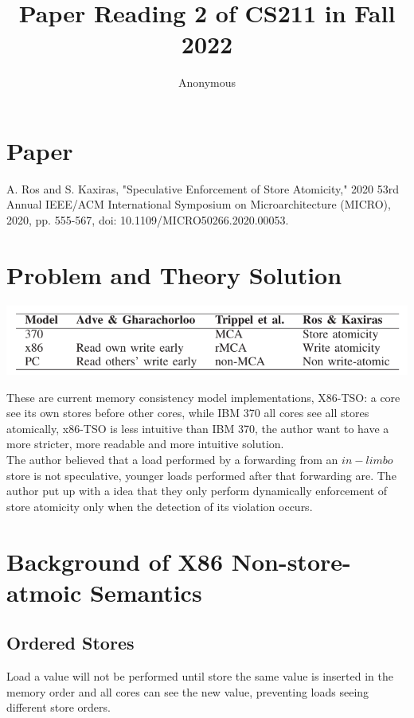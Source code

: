\documentclass[10pt,a4paper]{article}
\begin{document}
\title{Paper Reading 2 of CS211 in Fall 2022}
\author{Anonymous}
\date{}
\maketitle


\section{Paper}
A. Ros and S. Kaxiras, "Speculative Enforcement of Store Atomicity," 2020 53rd Annual IEEE/ACM International Symposium on Microarchitecture (MICRO), 2020, pp. 555-567, doi: 10.1109/MICRO50266.2020.00053.

\section{Problem and Theory Solution}
\begin{center}
	\includegraphics[scale = 0.4]{1.png}
\end{center}
These are current memory consistency model implementations, X86-TSO: a core see its own stores before other cores, while IBM 370 all cores see all stores atomically, x86-TSO is less intuitive than IBM 370, the author want to have a more stricter, more readable and more intuitive solution. \\
The author believed that a load performed by a forwarding from an $in-limbo$ store is not speculative, younger loads performed after that forwarding are. The author put up with a idea that they only perform dynamically enforcement of store atomicity only when the detection of its violation occurs.

\section{Background of X86 Non-store-atmoic Semantics}
\subsection{Ordered Stores}
Load a value will not be performed until store the same value is inserted in the memory order and all cores can see the new value, preventing loads seeing different store orders.
\end{document}
